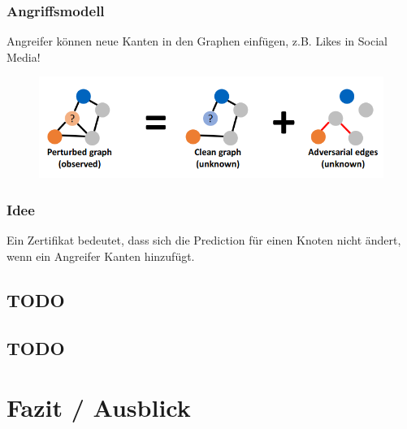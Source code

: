 \documentclass{beamer}
\begin{document}
\begin{frame}
  \frametitle{Angriffsmodell}
  Angreifer können neue Kanten in den Graphen einfügen, z.B. Likes in Social Media!
  \begin{figure}
    \centering
    \includegraphics[width=\textwidth]{img/high_level_graph_pert.png}
    \caption*{ \cite{}}
  \end{figure}
\end{frame}

\begin{frame}
  \frametitle{Idee}

  Ein Zertifikat bedeutet, dass sich die Prediction für einen Knoten nicht ändert, wenn ein Angreifer Kanten hinzufügt.
\end{frame}

\subsection{TODO}

\subsection{TODO}

\section{Fazit / Ausblick}
\end{document}
